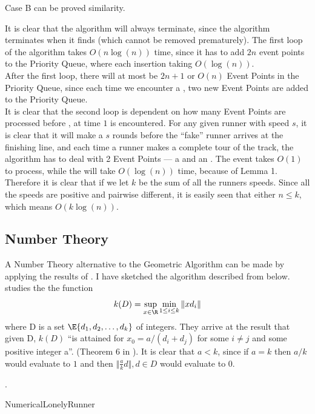 {{Case B can be proved similarity.


}{
It is clear that the algorithm will always terminate, since the algorithm terminates when it finds \comFin (which cannot be removed prematurely).
}{
The first loop of the algorithm takes $O(n\log(n))$ time, since it has to add $2n$ event points to the Priority Queue, where each insertion taking $O(\log(n))$.\\

After the first loop, there will at most be $2n + 1$ or $O(n)$ Event Points in the Priority Queue, since each time we encounter a \comEnd, two new Event Points are added to the Priority Queue.\\ 

It is clear that the second loop is dependent on how many Event Points are processed before \comFin, at time $1$ is encountered. For any given runner with speed $s$, it is clear that it will make a $s$ rounds before the ``fake'' runner arrives at the finishing line, and each time  a runner makes a complete tour of the track, the algorithm has to deal with 2 Event Points --- a \comStart\; and an \comEnd. The \comStart\; event takes $O(1)$ to process, while the \comEnd will take $O(\log(n))$ time, because of Lemma 1. Therefore it is clear that if we let  $k$ be the sum of all the runners speeds. Since all the speeds are positive and pairwise different, it is easily seen that either $n \leq k$, which means $O(k\log(n))$.
}

\subsection{Number Theory}
\label{numtheory:algo}
A Number Theory alternative to the Geometric Algorithm can be made by applying the results of \cite{invis}. I have sketched the algorithm described from \cite{invis} below. \cite{invis} studies the the function 
$$
k(D) = \sup_{x \in \R}\min_{1 \leq i \leq k}\Vert x d_i \Vert
$$
where D is a set $\E{d_1, d_2, \ldots, d_k}$ of integers. They arrive at the result that given D, $k(D)$ ``is attained for $x_0 = a /(d_i + d_j)$ for some $i \neq j$ and some positive integer a''. (Theorem 6 in \cite{invis}). It is clear that $a < k$, since if $a = k$ then $a/k$ would evaluate to $1$ and then $\Vert \frac{a}{k} d\Vert, d \in D$ would evaluate to 0.

 .

\begin{algorithm}[H]
  \caption{NumericalLonelyRunner}
  \highlights
  

\end{algorithm}}
